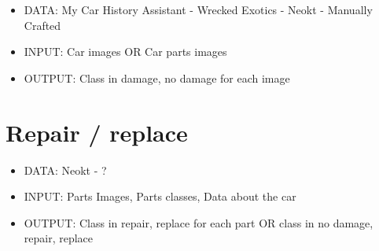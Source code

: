 \begin{itemize}
    \item DATA: My Car History Assistant - Wrecked Exotics - Neokt - Manually Crafted
    \item INPUT: Car images OR Car parts images
    \item OUTPUT: Class in damage, no damage for each image
\end{itemize}


\section{Repair / replace}

\begin{itemize}
    \item DATA: Neokt - ?
    \item INPUT: Parts Images, Parts classes, Data about the car
    \item OUTPUT: Class in repair, replace for each part OR class in no damage, repair, replace
\end{itemize}